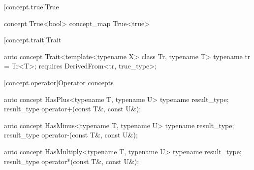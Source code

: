 \documentclass[american,twoside]{book}
\begin{document}
[concept.true]{True}

\begin{itemdecl}
concept True<bool> { }
concept_map True<true> { }
\end{itemdecl}

\begin{itemdescr}
\pnum
{}

\pnum
{}
\end{itemdescr}

[concept.trait]{Trait}

\begin{itemdecl}
auto concept Trait<template<typename X> class Tr, typename T>
{
  typename tr = Tr<T>;
  requires DerivedFrom<tr, true_type>;
}
\end{itemdecl}

\begin{itemdescr}
\pnum
{}
\end{itemdescr}

[concept.operator]{Operator concepts}
\begin{itemdecl}
auto concept HasPlus<typename T, typename U> {
  typename result_type;
  result_type operator+(const T&, const U&);
}
\end{itemdecl}

\begin{itemdescr}
\pnum
{}
\end{itemdescr}

\begin{itemdecl}
auto concept HasMinus<typename T, typename U> {
  typename result_type;
  result_type operator-(const T&, const U&);
}
\end{itemdecl}

\begin{itemdescr}
\pnum
{}
\end{itemdescr}

\begin{itemdecl}
auto concept HasMultiply<typename T, typename U> {
  typename result_type;
  result_type operator*(const T&, const U&);
}
\end{itemdecl}
\end{document}
